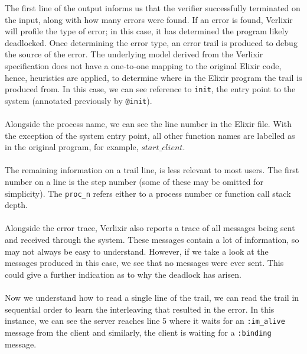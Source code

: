 The first line of the output informs us that the verifier successfully terminated on the input, along with how many errors were found. If an error is found, Verlixir will profile the type of error; in this case, it has determined the program likely deadlocked. Once determining the error type, an error trail is produced to debug the source of the error. The underlying model derived from the Verlixir specification does not have a one-to-one mapping to the original Elixir code, hence, heuristics are applied, to determine where in the Elixir program the trail is produced from. In this case, we can see reference to \texttt{init}, the entry point to the system (annotated previously by \texttt{@init}).
\\ \\
Alongside the process name, we can see the line number in the Elixir file. With the exception of the system entry point, all other function names are labelled as in the original program, for example, $start\_client$.
\\ \\
The remaining information on a trail line, is less relevant to most users. The first number on a line is the step number (some of these may be omitted for simplicity). The \texttt{proc\_n} refers either to a process number or function call stack depth.
\\ \\
Alongside the error trace, Verlixir also reports a trace of all messages being sent and received through the system. These messages contain a lot of information, so may not always be easy to understand. However, if we take a look at the messages produced in this case, we see that no messages were ever sent. This could give a further indication as to why the deadlock has arisen.
\\ \\
Now we understand how to read a single line of the trail, we can read the trail in sequential order to learn the interleaving that resulted in the error. In this instance, we can see the server reaches line 5 where it waits for an \texttt{:im\_alive} message from the client and similarly, the client is waiting for a \texttt{:binding} message.
